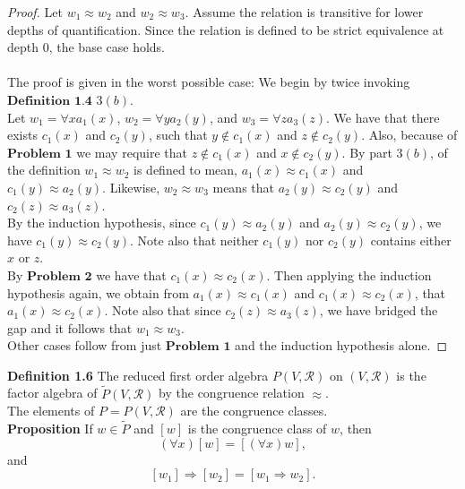 \documentclass{article}
\theoremstyle{problemstyle}
\theoremstyle{lemmastyle}
\theoremstyle{theoremstyle}
\theoremstyle{problemstyle}
\begin{document}
\begin{proof}
Let $w_1 \approx w_2$ and $w_2 \approx w_3$. Assume the relation is transitive for lower depths of quantification. Since the relation is defined to be strict equivalence at depth $0$, the base case holds.\\\\ The proof is given in the worst possible case: We begin by twice invoking $\textbf{Definition 1.4}$ $3 (b)$. \\

Let $w_1 = \forall x a_1(x)$, $w_2 = \forall y a_2(y)$, and $w_3 = \forall z a_3(z)$. We have that there exists $c_1(x)$ and $c_2(y)$, such that $y \notin c_1(x)$ and $z \notin c_2(y)$. Also, because of $\textbf{Problem 1}$ we may require that $z \notin c_1(x)$ and $x \notin c_2(y)$.  By part $3 (b)$, of the definition $w_1 \approx w_2$ is defined to mean, $a_1(x) \approx c_1(x)$ and $c_1(y) \approx a_2(y)$. Likewise, $w_2 \approx w_3$ means that $a_2(y) \approx c_2(y)$ and $c_2(z) \approx a_3(z)$.\\

By the induction hypothesis, since $c_1(y) \approx a_2(y)$ and $a_2(y) \approx c_2(y)$, we have $c_1(y) \approx c_2(y)$. Note also that neither $c_1(y)$ nor $c_2(y)$ contains either $x$ or $z$.\\

By $\textbf{Problem 2}$ we have that  $c_1(x) \approx c_2(x)$. Then applying the induction hypothesis again, we obtain from $a_1(x) \approx c_1(x)$ and $c_1(x) \approx c_2(x)$, that $a_1(x) \approx c_2(x)$. Note also that since $c_2(z) \approx a_3(z)$, we have bridged the gap and it follows that $w_1 \approx w_3$.\\

Other cases follow from just $\textbf{Problem 1}$ and the induction hypothesis alone. 

\end{proof}

\noindent
\textbf{Definition 1.6}
The reduced first order algebra $P(V, \mathscr{R})$ on $(V, \mathscr{R})$ is the factor algebra of $\widetilde{P}(V,\mathscr{R})$ by the congruence relation $\approx$.\\ 

\noindent
The elements of $P = P(V,\mathscr{R})$ are the congruence classes.\\ 

\textbf{Proposition} If $w \in \widetilde{P}$ and $[w]$ is the congruence class of $w$, then $$(\forall x)[w] = [(\forall x)w],$$ and $$[w_1] \Rightarrow [w_2] = [w_1 \Rightarrow w_2].$$
\end{document}
